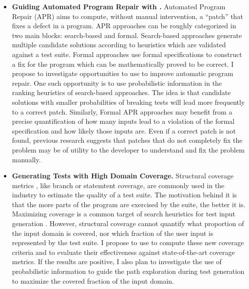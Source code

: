 \documentclass[10pt]{article}
\newcounter{list}
\begin{document}
\begin{itemize}
\item \textbf{Guiding Automated Program Repair with \PSE{}.}
Automated Program Repair \cite{le2015manybugs} (APR) aims to compute,
without manual intervention, a ``patch'' that fixes a defect in a
program. APR approaches can be roughly categorized in two main blocks:
search-based and formal.  Search-based approaches generate multiple
candidate solutions according to heuristics which are validated
against a test suite. Formal approaches use formal specifications to
construct a fix for the program which can be mathematically proved to
be correct. I propose to investigate opportunities to use \PSE{} to
improve automatic program repair. One such opportunity is to use
probabilistic information in the ranking heuristics of search-based
approaches. The idea is that candidate solutions with smaller
probabilities of breaking tests will lead more frequently to a correct
patch. Similarly, Formal APR approaches may benefit from a precise
quantification of how many inputs lead to a violation of the formal
specification and how likely those inputs are. Even if a correct patch
is not found, previous research \cite{le2013current} suggests that
patches that do not completely fix the problem may be of utility to
the developer to understand and fix the problem manually.


\item \textbf{Generating Tests with High Domain Coverage.}  Structural
  coverage metrics \cite{mockus2009test}, like branch or statemtent
  coverage, are commonly used in the industry to estimate the quality
  of a test suite. The motivation behind it is that the more parts of
  the program are exercised by the suite, the better it is. Maximizing
  coverage is a common target of search heuristics for test input
  generation \cite{godefroid2008automated}. However, structural
  coverage cannot quantify what proportion of the input domain is
  covered, nor which fraction of the user input is represented by the
  test suite. I propose to use \PSE{} to compute these new coverage
  criteria and to evaluate their effectiveness against
  state-of-the-art coverage metrics. If the results are positive, I
  also plan to investigate the use of probabilistic information to
  guide the path exploration during test generation to maximize
  the covered fraction of the input domain.
  
\end{itemize}
\end{document}
